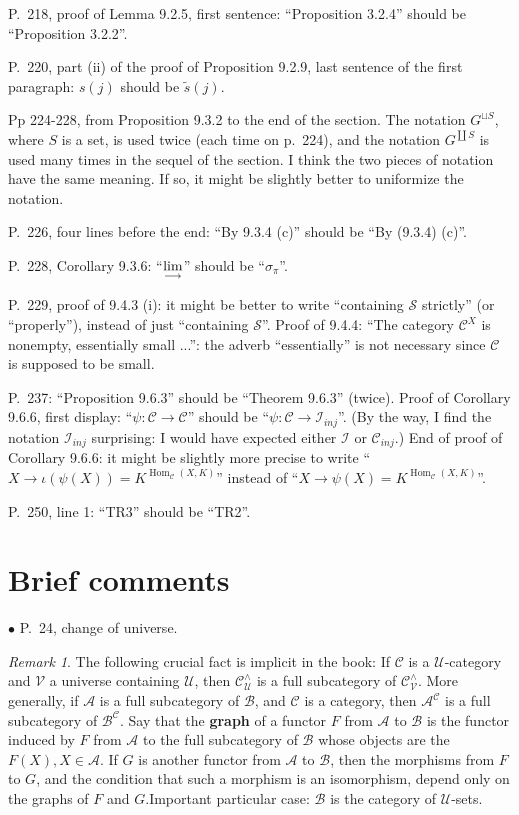 \documentclass[12pt]{article}
\theoremstyle{remark}%
\newtheorem{rk}[thm]{Remark}%
\newcommand{\bu}{\bullet}
\newcommand{\n}{\noindent}
\newcommand{\A}{\mathcal A}
\newcommand{\B}{\mathcal B}
\newcommand{\C}{\mathcal C}
\newcommand{\U}{\mathcal U}
\newcommand{\ilim}{\operatornamewithlimits{\underset{\longrightarrow}{lim}}}
\DeclareMathOperator{\Hom}{Hom}
\begin{document}
\n P.~218, proof of Lemma 9.2.5, first sentence: ``Proposition 3.2.4'' should be ``Proposition 3.2.2''.

\n P.~220, part (ii) of the proof of Proposition 9.2.9, last sentence of the first paragraph: $s(j)$ should be $\tilde s(j)$.

\n Pp 224-228, from Proposition 9.3.2 to the end of the section. The notation $G^{\sqcup S}$, where $S$ is a set, is used twice (each time on p.~224), and the notation $G^{\coprod S}$ is used many times in the sequel of the section. I think the two pieces of notation have the same meaning. If so, it might be slightly better to uniformize the notation.

\n P.~226, four lines before the end: ``By 9.3.4 (c)'' should be ``By (9.3.4) (c)''.

\n P.~228, Corollary 9.3.6: ``$\ilim$'' should be ``$\sigma_\pi$''.

\n P.~229, proof of 9.4.3 (i): it might be better to write ``containing $\mathcal S$ strictly'' (or ``properly''), instead of just ``containing $\mathcal S$''. Proof of 9.4.4: ``The category $\C^X$ is nonempty, essentially small ...'': the adverb ``essentially'' is not necessary since $\C$ is supposed to be small.

\n P.~237: ``Proposition 9.6.3'' should be ``Theorem 9.6.3'' (twice). Proof of Corollary 9.6.6, first display: ``$\psi:\C\to\C$'' should be ``$\psi:\C\to\mathcal I_{inj}$''. (By the way, I find the notation $\mathcal I_{inj}$ surprising: I would have expected either $\mathcal I$ or $\C_{inj}$.) End of proof of Corollary 9.6.6: it might be slightly more precise to write ``$X\to\iota(\psi(X))=K^{\Hom_\C(X,K)}$'' instead of ``$X\to\psi(X)=K^{\Hom_\C(X,K)}$''. 

\n P.~250, line 1: ``TR3'' should be ``TR2''.
%
\section{Brief comments}\label{bc}%
%
\n$\bu$ P.~24, change of universe. 
% 
\begin{rk}\label{graph} 
The following crucial fact is implicit in the book: If $\C$ is a $\U$-category and $\mathcal V$ a universe containing $\U$, then $\C^\wedge_\U$ is a full subcategory of $\C^\wedge_\mathcal{V}$. More generally, if $\A$ is a full subcategory of $\B$, and $\C$ is a category, then $\A^\C$ is a full subcategory of $\B^\C$. Say that the \textbf{graph} of a functor $F$ from $\A$ to $\B$ is the functor induced by $F$ from $\A$ to the full subcategory of $\B$ whose objects are the $F(X),X\in\A$. If $G$ is another functor from $\A$ to $\B$, then the morphisms from $F$ to $G$, and the condition that such a morphism is an isomorphism, depend only on the graphs of $F$ and $G$.Important particular case: $\B$ is the category of $\U$-sets. 
\end{rk} 
\end{document}
